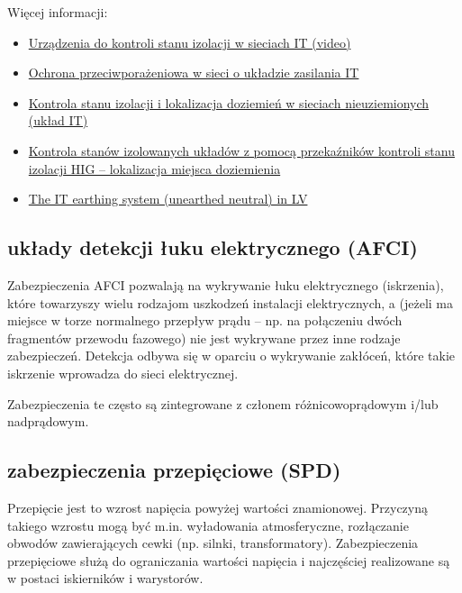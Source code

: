 \vspace{7pt}\noindent
Więcej informacji:
\begin{itemize}
	\item \href{https://www.youtube.com/watch?v=fs5UW-PUpLE}{Urządzenia do kontroli stanu izolacji w sieciach IT (video)}
	\item \href{https://elektroenergetyka.pl/upload/file/2020/04/wiatr_kwiecien_2020.pdf}{Ochrona przeciwporażeniowa w sieci o układzie zasilania IT}
	\item \href{https://www.promac.com.pl/wp-content/uploads/2018/11/Kontrola-izolacji-lokalizacja-IT.pdf}{Kontrola stanu izolacji i lokalizacja doziemień w sieciach nieuziemionych (układ IT)}
	\item \href{https://www.repostechnik.pl/wp-content/uploads/2017/05/HIG-IFL1_PL.pdf}{Kontrola stanów izolowanych układów z pomocą przekaźników kontroli stanu izolacji HIG – lokalizacja miejsca doziemienia}
	\item \href{https://www.studiecd.dk/cahiers_techniques/The_IT_system_earthing_in_LV.pdf}{The IT earthing system (unearthed neutral) in LV}
\end{itemize}

\subsection{układy detekcji łuku elektrycznego (AFCI)}

Zabezpieczenia AFCI pozwalają na wykrywanie łuku elektrycznego (iskrzenia), które towarzyszy wielu rodzajom uszkodzeń instalacji elektrycznych,
	a (jeżeli ma miejsce w torze normalnego przepływ prądu – np. na połączeniu dwóch fragmentów przewodu fazowego) nie jest wykrywane przez inne rodzaje zabezpieczeń.
Detekcja odbywa się w oparciu o wykrywanie zakłóceń, które takie iskrzenie wprowadza do sieci elektrycznej.

Zabezpieczenia te często są zintegrowane z członem różnicowoprądowym i/lub nadprądowym.

\subsection{zabezpieczenia przepięciowe (SPD)}

Przepięcie jest to wzrost napięcia powyżej wartości znamionowej. Przyczyną takiego wzrostu mogą być m.in. wyładowania atmosferyczne, rozłączanie obwodów zawierających cewki (np. silnki, transformatory).
Zabezpieczenia przepięciowe służą do ograniczania wartości napięcia i najczęściej realizowane są w postaci iskierników i warystorów.

